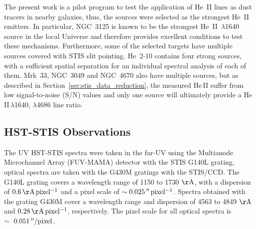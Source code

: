 \documentclass[]{aastex63}
\begin{document}
The present work is a pilot program to test the application of He~II lines as dust tracers in nearby galaxies, thus, the sources were selected as the strongest He~II emitters. In particular, NGC~3125 is known to be the strongest He~II~$\lambda$1640 source in the local Universe \citep{chandar_ngc_2004} and therefore provides excellent conditions to test these mechanisms.
Furthermore, some of the selected targets have multiple sources covered with STIS slit pointing. He~2-10 contains four strong sources, with a sufficient spatial separation for an individual spectral analysis of each of them. Mrk~33, NGC~3049 and NGC~4670 also have multiple sources, but as described in Section~\ref{sec:stis_data_reduction}, the measured He\,II suffer from low signal-to-noise (S/N) values and only one source will ultimately provide a He\,II\,$\lambda$1640, $\lambda$4686 line ratio.


\subsection{HST-STIS Observations}\label{sect:stis_obs}
The UV HST-STIS spectra were taken in the far-UV using the Multianode Microchannel Array (FUV-MAMA) detector with the STIS G140L grating, optical spectra are taken with the G430M gratings with the STIS/CCD. 
The G140L grating covers a wavelength range of 1150 to 1730 ${\rm \AA}$, with a dispersion of $0.6\,{\rm \AA \, pixel^{-1}}$ and a pixel scale of $\sim0.025\,^{\prime\prime}\,{\rm pixel^{-1}}$.
Spectra obtained with the grating G430M cover a wavelength range and dispersion of 4563 to 4849 ${\rm \AA}$ and $0.28\,{\rm \AA \, pixel^{-1}}$, respectively. The pixel scale for all optical spectra is $\sim~0.051\,{\rm \mbox{$^{\prime\prime}$}/pixel}$.
\end{document}
